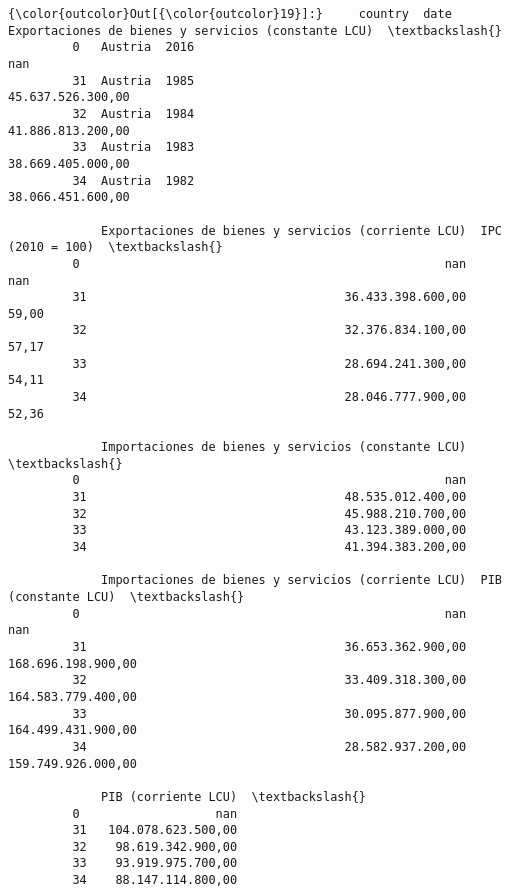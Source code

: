 \documentclass[11pt]{article}
\begin{document}
            \begin{Verbatim}[commandchars=\\\{\}]
{\color{outcolor}Out[{\color{outcolor}19}]:}     country  date  Exportaciones de bienes y servicios (constante LCU)  \textbackslash{}
         0   Austria  2016                                                  nan   
         31  Austria  1985                                    45.637.526.300,00   
         32  Austria  1984                                    41.886.813.200,00   
         33  Austria  1983                                    38.669.405.000,00   
         34  Austria  1982                                    38.066.451.600,00   
         
             Exportaciones de bienes y servicios (corriente LCU)  IPC (2010 = 100)  \textbackslash{}
         0                                                   nan               nan   
         31                                    36.433.398.600,00             59,00   
         32                                    32.376.834.100,00             57,17   
         33                                    28.694.241.300,00             54,11   
         34                                    28.046.777.900,00             52,36   
         
             Importaciones de bienes y servicios (constante LCU)  \textbackslash{}
         0                                                   nan   
         31                                    48.535.012.400,00   
         32                                    45.988.210.700,00   
         33                                    43.123.389.000,00   
         34                                    41.394.383.200,00   
         
             Importaciones de bienes y servicios (corriente LCU)  PIB (constante LCU)  \textbackslash{}
         0                                                   nan                  nan   
         31                                    36.653.362.900,00   168.696.198.900,00   
         32                                    33.409.318.300,00   164.583.779.400,00   
         33                                    30.095.877.900,00   164.499.431.900,00   
         34                                    28.582.937.200,00   159.749.926.000,00   
         
             PIB (corriente LCU)  \textbackslash{}
         0                   nan   
         31   104.078.623.500,00   
         32    98.619.342.900,00   
         33    93.919.975.700,00   
         34    88.147.114.800,00   
         

\end{Verbatim}
\end{document}
